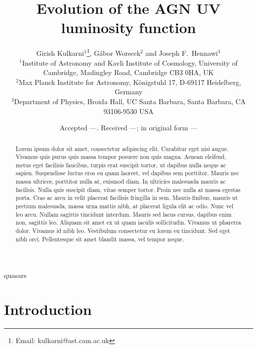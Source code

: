 \documentclass[a4paper,fleqn,usenatbib]{mnras}
\title[AGN luminosity function]{Evolution of the AGN UV luminosity function}
\author[Kulkarni et al.]{{Girish Kulkarni$^{1}$\thanks{Email:
      kulkarni@ast.cam.ac.uk}, G\'abor Worseck$^{2}$ and Joseph
    F.~Hennawi$^{3}$} \\ $^1$Institute of Astronomy and Kavli
  Institute of Cosmology, University of Cambridge, Madingley Road,
  Cambridge CB3 0HA, UK \\ $^2$Max Planck Institute for Astronomy,
  K\"onigstuhl 17, D-69117 Heidelberg, Germany\\ $^3$Department of
  Physics, Broida Hall, UC Santa Barbara, Santa Barbara, CA 93106-9530
  USA}
\date{Accepted ---. Received ---; in original form ---}
\begin{document}
\label{firstpage}
\pagerange{\pageref{firstpage}--\pageref{lastpage}}
\maketitle

\begin{abstract}
  Lorem ipsum dolor sit amet, consectetur adipiscing elit. Curabitur
  eget nisi augue. Vivamus quis purus quis massa tempor posuere non
  quis magna. Aenean eleifend, metus eget facilisis faucibus, turpis
  erat suscipit tortor, ut dapibus nulla neque ac sapien. Suspendisse
  luctus eros eu quam laoreet, vel dapibus sem porttitor. Mauris nec
  massa ultrices, porttitor nulla at, euismod diam. In ultricies
  malesuada mauris ac facilisis. Nulla quis suscipit diam, vitae
  semper tortor. Proin nec nulla at massa egestas porta. Cras ac arcu
  in velit placerat facilisis fringilla in sem. Mauris finibus, mauris
  ut pretium malesuada, massa urna mattis nibh, at placerat ligula
  elit ac odio.  Nunc vel leo arcu. Nullam sagittis tincidunt
  interdum. Mauris sed lacus cursus, dapibus enim non, sagittis
  leo. Aliquam sit amet ex ut quam iaculis sollicitudin. Vivamus ut
  pharetra dolor. Vivamus id nibh leo. Vestibulum consectetur eu lorem
  eu tincidunt. Sed eget nibh orci. Pellentesque sit amet blandit
  massa, vel tempor neque.
\end{abstract}

\begin{keywords}
quasars
\end{keywords}


\section{Introduction}
\end{document}
